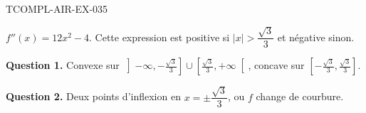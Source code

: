 \begin{corrige}{TCOMPL-AIR-EX-035}

$f''(x) = 12x^2 - 4$. Cette expression est positive si $|x| > \dfrac{\sqrt{3}}{3}$ et négative sinon.


\textbf{Question 1.} Convexe sur $\left]-\infty, -\frac{\sqrt3}{3}\right] \cup \left[\frac{\sqrt3}{3}, +\infty\right[$, concave sur $\left[-\frac{\sqrt3}{3}, \frac{\sqrt3}{3}\right]$.

\textbf{Question 2.} Deux points d'inflexion en $x = \pm\dfrac{\sqrt{3}}{3}$, ou $f$ change de courbure.

\end{corrige}
